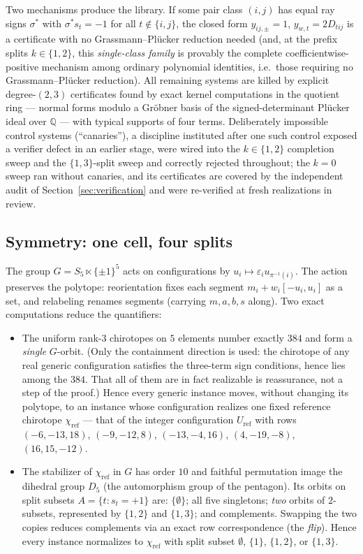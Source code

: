 \documentclass[11pt]{amsart}
\theoremstyle{remark}
\begin{document}
Two mechanisms produce the library. If some pair class $(i,j)$ has
equal ray signs $\sigma^*$ with $\sigma^* s_t=-1$ for all
$t\notin\{i,j\}$, the closed form $y_{ij,\pm}=1$,
$y_{w,t}=2D_{tij}$ is a certificate with no Grassmann--Pl\"ucker
reduction needed (and, at the prefix splits $k\in\{1,2\}$, this
\emph{single-class family} is provably the complete
coefficientwise-positive mechanism among ordinary polynomial
identities, i.e.\ those requiring no Grassmann--Pl\"ucker reduction). All remaining systems are
killed by explicit degree-$(2,3)$ certificates found by exact kernel
computations in the quotient ring --- normal forms modulo a
Gr\"obner basis of the signed-determinant Pl\"ucker ideal over
$\mathbb{Q}$ --- with typical supports of four terms.
Deliberately impossible control systems (``canaries''), a discipline
instituted after one such control exposed a verifier defect in an
earlier stage, were wired into the $k\in\{1,2\}$ completion sweep and
the $\{1,3\}$-split sweep and correctly rejected throughout; the
$k=0$ sweep ran without canaries, and its certificates are covered by
the independent audit of Section~\ref{sec:verification} and were
re-verified at fresh realizations in review.

\subsection{Symmetry: one cell, four splits}\label{sec:symmetry}
The group $G=S_5\ltimes\{\pm1\}^5$ acts on configurations by
$u_i \mapsto \varepsilon_i u_{\pi^{-1}(i)}$. The action preserves the
polytope: reorientation fixes each segment
$m_i+w_i[-u_i,u_i]$ as a set, and relabeling renames segments (carrying
$m, a, b, s$ along). Two exact computations reduce the quantifiers:

\begin{itemize}
\item[(i)] The uniform rank-$3$ chirotopes on $5$ elements number
exactly $384$ and form a \emph{single} $G$-orbit. (Only the
containment direction is used: the chirotope of any real generic
configuration satisfies the three-term sign conditions, hence lies
among the $384$. That all of them are in fact realizable
\cite[Ch.~8]{OMbook} is reassurance, not a step of the proof.) Hence every generic instance moves, without
changing its polytope, to an instance whose configuration realizes one
fixed reference chirotope $\chi_{\mathrm{ref}}$ --- that of the integer
configuration
$U_{\mathrm{ref}}$ with rows
$(-6,-13,18)$, $(-9,-12,8)$, $(-13,-4,16)$, $(4,-19,-8)$,
$(16,15,-12)$.
\item[(ii)] The stabilizer of $\chi_{\mathrm{ref}}$ in $G$ has order
$10$ and faithful permutation image the dihedral group $D_5$ (the
automorphism group of the pentagon). Its orbits on split subsets
$A=\{t: s_t=+1\}$ are: $\{\emptyset\}$; all five singletons; \emph{two}
orbits of $2$-subsets, represented by $\{1,2\}$ and $\{1,3\}$; and
complements. Swapping the two copies reduces complements via an exact
row correspondence (the \emph{flip}). Hence every instance normalizes
to $\chi_{\mathrm{ref}}$ with split subset
$\emptyset$, $\{1\}$, $\{1,2\}$, or $\{1,3\}$.
\end{itemize}
\end{document}
